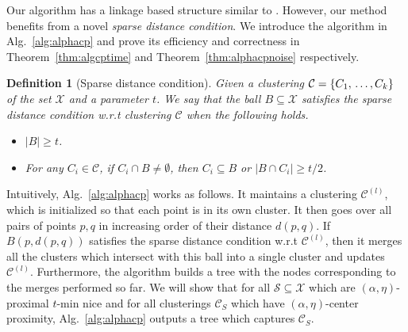 \documentclass[letterpaper,12pt,titlepage,oneside,final]{book}
\newtheorem{definition}{Definition}
\newcommand{\mc}{\mathcal}
\begin{document}
Our algorithm has a linkage based structure similar to \cite{balcan2012clustering}. However, our method benefits from a novel {\it sparse distance condition}. We introduce the algorithm in Alg.~\ref{alg:alphacp} and prove its efficiency and correctness in Theorem~\ref{thm:algcptime} and Theorem~\ref{thm:alphacpnoise} respectively. 

\begin{definition}[Sparse distance condition]
	 Given a clustering $\mc C = \{C_1,\\\ldots,C_k\}$ of the set $\mc X$ and a parameter $t$. We say that the ball $B \subseteq \mc X$ satisfies the sparse distance condition w.r.t clustering $\mc C$ when the following holds.
	 
\begin{itemize}
\item $|B| \ge t$.
\item For any $C_i \in \mc C$, if $C_i \cap B \neq \emptyset$, then $C_i \subseteq B$ or $|B \cap C_i| \ge t/2$.
\end{itemize}
\end{definition}

Intuitively, Alg.~\ref{alg:alphacp} works as follows. It maintains a clustering $\mc C^{(l)}$, which is initialized so that each point is in its own cluster. It then goes over all pairs of points $p, q$ in increasing order of their distance $d(p, q)$. If $B(p, d(p,q))$ satisfies the sparse distance condition w.r.t $\mc C^{(l)}$, then it merges all the clusters which intersect with this ball into a single cluster and updates $\mc C^{(l)}$. Furthermore, the algorithm builds a tree with the nodes corresponding to the merges performed so far. We will show that for all $\mc S \subseteq \mc X$ which are $(\alpha, \eta)$-proximal $t$-min nice and for all clusterings $\mc C_S$ which have $(\alpha, \eta)$-center proximity, Alg.~\ref{alg:alphacp} outputs a tree which captures $\mc C_S$.
\end{document}
